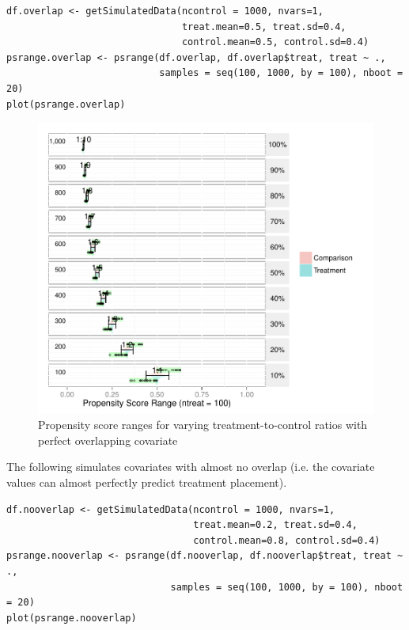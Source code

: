 \begin{singlespace}
\begin{verbatim}
df.overlap <- getSimulatedData(ncontrol = 1000, nvars=1,
                               treat.mean=0.5, treat.sd=0.4,
                               control.mean=0.5, control.sd=0.4)
psrange.overlap <- psrange(df.overlap, df.overlap$treat, treat ~ ., 
                           samples = seq(100, 1000, by = 100), nboot = 20)
plot(psrange.overlap)
\end{verbatim}

\begin{figure}[h!]
\begin{center}
\includegraphics[width=\textwidth]{../Figures2009/PSRanges-Overlap.pdf}
\caption{Propensity score ranges for varying treatment-to-control ratios with perfect overlapping covariate}
\end{center}
\end{figure}

\noindent The following simulates covariates with almost no overlap (i.e. the covariate values can almost perfectly predict treatment placement).

\begin{verbatim}
df.nooverlap <- getSimulatedData(ncontrol = 1000, nvars=1,
                                 treat.mean=0.2, treat.sd=0.4,
                                 control.mean=0.8, control.sd=0.4)
psrange.nooverlap <- psrange(df.nooverlap, df.nooverlap$treat, treat ~ ., 
                             samples = seq(100, 1000, by = 100), nboot = 20)
plot(psrange.nooverlap)
\end{verbatim}


\end{singlespace}
